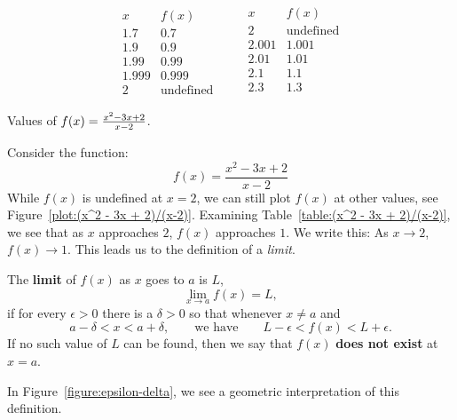 \begin{margintable}[-1in]
\[
\begin{array}{c|c}
 x & f(x) \\ \hline
 1.7 &  0.7 \\
 1.9 &  0.9 \\
 1.99 &  0.99 \\
 1.999 &  0.999 \\
  2 &  \text{undefined}
\end{array}\qquad
\begin{array}{c|c}
 x & f(x) \\ \hline
  2 & \text{undefined}\\
 2.001&  1.001\\
 2.01&  1.01\\
 2.1 &  1.1 \\
 2.3 &  1.3 \\
\end{array}
\]
\caption{Values of $f(x)=\protect\frac{x^2 - 3x + 2}{x-2}$.}
\label{table:(x^2 - 3x + 2)/(x-2)}
\end{margintable}
Consider the function:
\[
f(x) = \frac{x^2 - 3x + 2}{x-2}
\]
While $f(x)$ is undefined at $x=2$, we can still plot $f(x)$ at other
values, see Figure~\ref{plot:(x^2 - 3x + 2)/(x-2)}. Examining
Table~\ref{table:(x^2 - 3x + 2)/(x-2)}, we see that as $x$ approaches
$2$, $f(x)$ approaches $1$. We write this: As $x \to 2$, $f(x) \to 1$.
This leads us to the definition of a \textit{limit}.



\begin{definition}\label{def:limit} 
The \textbf{limit} of $f(x)$ as $x$ goes to $a$ is $L$,
\[
\lim_{x\to a}f(x)=L,
\] 
if for every $\epsilon>0$ there is a $\delta > 0$ so that whenever
$x\ne a$ and
\[
a- \delta < x < a+ \delta, \qquad\text{we have} \qquad L-\epsilon< f(x)<L+\epsilon.
\] 
If no such value of $L$ can be
found, then we say that $f(x)$ \textbf{does not exist} at $x=a$.
\end{definition}



In Figure~\ref{figure:epsilon-delta}, we see a geometric
interpretation of this definition.

